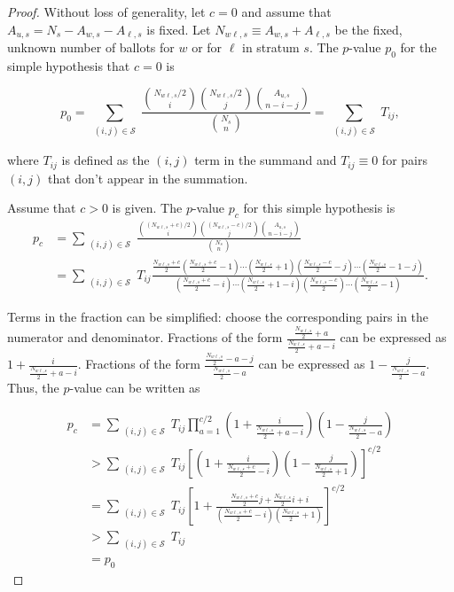 \begin{proof}
Without loss of generality, let $c=0$ and assume that $A_{u,s}=N_s - A_{w,s} - A_{\ell,s}$ is fixed.
Let $N_{w\ell, s} \equiv A_{w,s}+A_{\ell,s}$ be the fixed, unknown number of ballots for $w$ or for $\ell$ in stratum $s$.
The $p$-value $p_0$ for the simple hypothesis that $c=0$ is

\begin{equation}
  p_0 = \sum_{\substack{(i, j) \in \mathcal{S}}} \frac{ {N_{w\ell, s}/2 \choose i}{N_{w\ell, s}/2 \choose j}{A_{u,s} \choose n-i-j}}{{N_s \choose n}} =  \sum_{\substack{(i, j) \in \mathcal{S}}}T_{ij},
\end{equation}

\noindent where $T_{ij}$ is defined as the $(i, j)$ term in the summand and $T_{ij} \equiv 0$ for pairs $(i, j)$ that don't appear in the summation.

Assume that $c>0$ is given.
The $p$-value $p_c$ for this simple hypothesis is
\begin{align*}
p_c &=   \sum_{\substack{(i, j) \in \mathcal{S}}}  \frac{ {(N_{w\ell, s}+c)/2 \choose i}{(N_{w\ell, s}-c)/2 \choose j}{A_{u,s} \choose n-i-j}}{{N_s \choose n}}  \\
   &=\sum_{\substack{(i, j) \in \mathcal{S}}} T_{ij} \frac{ \frac{N_{w\ell, s}+c}{2}(\frac{N_{w\ell, s}+c}{2}-1)\cdots(\frac{N_{w\ell, s}}{2}+1) (\frac{N_{w\ell, s}-c}{2} -j)\cdots(\frac{N_{w\ell, s}}{2}-1-j) }
   {(\frac{N_{w\ell, s}+c}{2} -i)\cdots(\frac{N_{w\ell, s}}{2}+1-i)(\frac{N_{w\ell, s}-c}{2})\cdots(\frac{N_{w\ell, s}}{2}-1)}.
\end{align*}

Terms in the fraction can be simplified: choose the corresponding pairs in the numerator and denominator.
Fractions of the form $\frac{\frac{N_{w\ell, s}}{2} + a}{\frac{N_{w\ell,s}}{2} + a - i}$ can be expressed as $1 + \frac{i}{\frac{N_{w\ell,s}}{2} + a-i}$.
Fractions of the form $\frac{\frac{N_{w\ell, s}}{2}  - a - j}{\frac{N_{w\ell, s}}{2}  - a}$ can be expressed as $1 - \frac{j}{\frac{N_{w\ell, s}}{2} -a}$.
Thus, the $p$-value can be written as 

\begin{align*}
p_c &= \sum_{\substack{(i, j) \in \mathcal{S}}} T_{ij} \prod_{a=1}^{c/2} \left(1 + \frac{i}{\frac{N_{w\ell,s}}{2} + a-i}\right)\left(1 - \frac{j}{\frac{N_{w\ell, s}}{2} - a}\right) \\
&> \sum_{\substack{(i, j) \in \mathcal{S}}}  T_{ij} \left[ \left(1 + \frac{i}{\frac{N_{w\ell,s}+c}{2} -i}\right)\left(1 - \frac{j}{\frac{N_{w\ell, s}}{2}+1}\right) \right]^{c/2} \\
&= \sum_{\substack{(i, j) \in \mathcal{S}}} T_{ij} \left[ 1 + \frac{\frac{N_{w\ell,s}+c}{2}j + \frac{N_{w\ell,s}}{2}i + i}{(\frac{N_{w\ell,s}+c}{2}-i)(\frac{N_{w\ell,s}}{2}+1)}\right]^{c/2} \\
&> \sum_{\substack{(i, j) \in \mathcal{S}}}  T_{ij}\\
&= p_0
\end{align*}


\end{proof}

